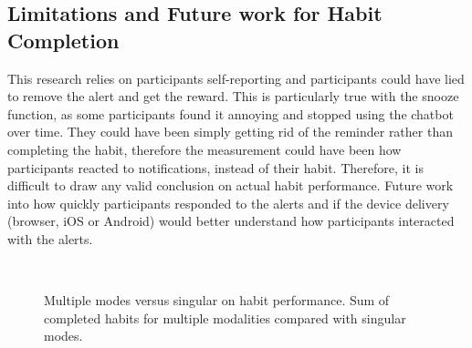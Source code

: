 \documentclass{scaffold/sigchi}
\begin{document}
\subsection{Limitations and Future work for Habit Completion}
This research relies on participants self-reporting and participants could have lied to remove the alert and get the reward. This is particularly true with the snooze function, as some participants found it annoying and stopped using the chatbot over time. They could have been simply getting rid of the reminder rather than completing the habit, therefore the measurement could have been how participants reacted to notifications, instead of their habit. Therefore, it is difficult to draw any valid conclusion on actual habit performance. Future work into how quickly participants responded to the alerts and if the device delivery (browser, iOS or Android) would better understand how participants interacted with the alerts.

\begin{figure}
  \centering
  \caption{Multiple modes versus singular on habit performance. Sum of completed habits for multiple modalities compared with singular modes.}~\label{fig:m1_h2}
\end{figure}
\end{document}

